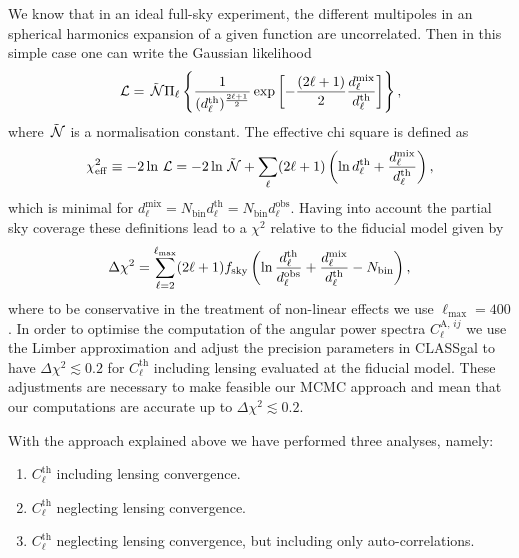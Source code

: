We know that in an ideal full-sky experiment, the different multipoles in an spherical harmonics expansion of a given function are uncorrelated. Then in this simple case one can write the Gaussian likelihood
\begin{equation}
\label{Eq:GNC-Gaussian-likelihood}
\,{\mathcal L} = \tilde{\,{\mathcal N}} \Pi_\ell \left\lbrace \frac{1}{(d_\ell^{\mathrm{th}})^{\frac{2\ell+1}{2}}} \exp \left[ -\frac{(2\ell+1)}{2} \frac{d_\ell^{\mathrm{mix}}}{d_\ell^{\mathrm{th}}}\right] \right\rbrace,                         
\end{equation}
where $\tilde{\,{\mathcal N}}$ is a normalisation constant. The effective chi square is defined as
\begin{equation}
\label{Eq:GNC-effective-chi2}
\chi^2_{\mathrm{eff}} \equiv -2 \ln \,{\mathcal L} = -2 \ln \tilde{\,{\mathcal N}} + \sum_\ell (2\ell+1)\left( \ln d_\ell^{\mathrm{th}} + \frac{d_\ell^{\mathrm{mix}}}{d_\ell^{\mathrm{th}}} \right), 
\end{equation}
which is minimal for $d_\ell^{\mathrm{mix}}= N_{\mathrm{bin}} d_\ell^{\mathrm{th}} = N_{\mathrm{bin}} d_\ell^{\mathrm{obs}}$. Having into account the partial sky coverage these definitions lead to a $\chi^2$ relative to the fiducial model given by                     
\begin{equation}
\label{Eq:relative-chi2}
\Delta \chi^2 = \sum_{\ell=2}^{\ell_{\mathrm{max}}} (2\ell+1) f_{\mathrm{sky}} \left( \ln \frac{d_\ell^{\mathrm{th}} }{d_\ell^{\mathrm{obs}}} + \frac{d_\ell^{\mathrm{mix}}}{d_\ell^{\mathrm{th}}} - N_{\mathrm{bin}} \right),
\end{equation}                           
where to be conservative in the treatment of non-linear effects we use $\ell_{\mathrm{max}}=400$. In order to optimise the computation of the angular power spectra $C_\ell^{\mathrm{A},\,ij}$ we use the Limber approximation and adjust the precision parameters in CLASSgal to have $\Delta \chi^2 \lesssim 0.2$ for $C_\ell^{\mathrm{th}}$ including lensing evaluated at the fiducial model. These adjustments are necessary to make feasible our MCMC approach and mean that our computations are accurate up to $\Delta \chi^2 \lesssim 0.2$.                              
                     
With the approach explained above we have performed three analyses, namely:
\begin{enumerate}
\item $C_\ell^{\mathrm{th}}$ including lensing convergence.
\item $C_\ell^{\mathrm{th}}$ neglecting lensing convergence.
\item $C_\ell^{\mathrm{th}}$ neglecting lensing convergence, but including only auto-correlations.
\end{enumerate}
                                                  
